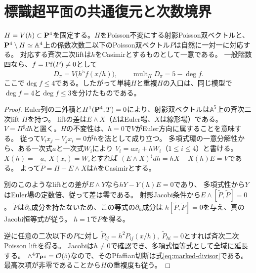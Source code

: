 \section{標識超平面の共通復元と次数境界}\label{sec:marked-common}
\begin{theorem}[標識超平面の一意なアフィン模型]\label{thm:marked-affine}
$H=V(h)\subset\mathbf P^4$を固定する。$H$をPoisson不変にする射影Poisson双ベクトルと、
$\mathbf P^4\setminus H\simeq\mathbb A^4$上の係数次数二以下のPoisson双ベクトル$P$は自然に一対一に対応する。
対応する斉次二次liftは$h$をCasimirとするものとして一意である。
一般階数四なら、$f=\operatorname{Pf}(P)\ne0$として
\begin{equation}
 D_\pi=V\bigl(h^5f(x/h)\bigr),\qquad
 \operatorname{mult}_H D_\pi=5-\deg f.                 \label{eq:marked-divisor}
\end{equation}
ここで$\deg f\le4$である。したがって単純$H$と重複$H$の入口は、同じ模型で
$\deg f=4$と$\deg f\le3$を分けたものである。
\end{theorem}
\begin{proof}
Euler列の二外積と$H^1(\mathbf P^4,T)=0$により、射影双ベクトルは$\mathbb A^5$上の斉次二次lift $\Pi$を持つ。
liftの差は$E\wedge X$（$E$はEuler場、$X$は線形場）である。
$V=\Pi^\sharp dh$と置く。$H$の不変性は、$h=0$で$V$がEuler方向に属することを意味する。
従って$V_i x_j-V_jx_i=0$が$h$を法として成り立つ。
多項式環の一意分解性から、ある一次式$a$と一次式$W_i$により
$V_i=ax_i+hW_i$（$1\le i\le4$）と書ける。
$X(h)=-a,\ X(x_i)=W_i$とすれば
$(E\wedge X)^\sharp dh=hX-X(h)E=V$である。
よって$\widetilde P=\Pi-E\wedge X$は$h$をCasimirとする。

別のこのようなliftとの差が$E\wedge Y$なら$hY-Y(h)E=0$であり、
多項式性から$Y$はEuler場の定数倍、従って差は零である。
射影Jacobi条件から$E\wedge[\widetilde P,\widetilde P]=0$。
$\widetilde P$は$\partial_h$成分を持たないため、この等式の$\partial_h$成分は
$h[\widetilde P,\widetilde P]=0$を与え、真のJacobi恒等式が従う。
$h=1$で$P$を得る。

逆に任意の二次以下の$P$に対し
$\widetilde P_{ij}=h^2P_{ij}(x/h),\ \widetilde P_{hi}=0$とすれば斉次二次Poisson liftを得る。
Jacobiは$h\ne0$で確認でき、多項式恒等式として全域に延長する。
$\wedge^4T_{\mathbf P^4}=\mathcal O(5)$なので、そのPfaffian切断は式\eqref{eq:marked-divisor}である。
最高次項が非零であることから$H$の重複度も従う。
\end{proof}


